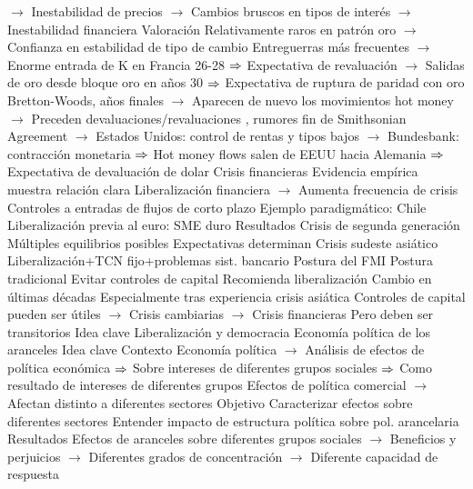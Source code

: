 \documentclass{nuevotema}
\begin{document}
\begin{esquemal}
				\4[] $\to$ Inestabilidad de precios
				\4[] $\to$ Cambios bruscos en tipos de interés
				\4[] $\to$ Inestabilidad financiera
				\4 Valoración
				\4[] Relativamente raros en patrón oro
				\4[] $\to$ Confianza en estabilidad de tipo de cambio
				\4[] Entreguerras más frecuentes
				\4[] $\to$ Enorme entrada de K en Francia 26-28
				\4[] $\Rightarrow$ Expectativa de revaluación
				\4[] $\to$ Salidas de oro desde bloque oro en años 30
				\4[] $\Rightarrow$ Expectativa de ruptura de paridad con oro
				\4[] Bretton-Woods, años finales
				\4[] $\to$ Aparecen de nuevo los movimientos hot money
				\4[] $\to$ Preceden devaluaciones/revaluaciones
				, rumores fin de Smithsonian Agreement
				\4[] $\to$ Estados Unidos: control de rentas y tipos bajos
				\4[] $\to$ Bundesbank: contracción monetaria
				\4[] $\Rightarrow$ Hot money flows salen de EEUU hacia Alemania
				\4[] $\Rightarrow$ Expectativa de devaluación de dolar
			\3 Crisis financieras
				\4 Evidencia empírica muestra relación clara
				\4[] Liberalización financiera
				\4[] $\to$ Aumenta frecuencia de crisis
			\3 Controles a entradas de flujos de corto plazo
				\4 Ejemplo paradigmático: Chile
			\3 Liberalización previa al euro: SME duro
				\4 Resultados
				\4[] Crisis de segunda generación
				\4[] Múltiples equilibrios posibles
				\4[] Expectativas determinan
			\3 Crisis sudeste asiático
				\4 Liberalización+TCN fijo+problemas sist. bancario
			\3 Postura del FMI
				\4 Postura tradicional
				\4[] Evitar controles de capital
				\4[] Recomienda liberalización
				\4 Cambio en últimas décadas
				\4[] Especialmente tras experiencia crisis asiática
				\4[] Controles de capital pueden ser útiles
				\4[] $\to$ Crisis cambiarias
				\4[] $\to$ Crisis financieras
				\4[] Pero deben ser transitorios
	\1 
		\2 Idea clave
		\2 Liberalización y democracia
		\2 Economía política de los aranceles
			\3 Idea clave
				\4 Contexto
				\4[] Economía política
				\4[] $\to$ Análisis de efectos de política económica
				\4[] $\Rightarrow$ Sobre intereses de diferentes grupos sociales
				\4[] $\Rightarrow$ Como resultado de intereses de diferentes grupos
				\4[] Efectos de política comercial
				\4[] $\to$ Afectan distinto a diferentes sectores
				\4 Objetivo
				\4[] Caracterizar efectos sobre diferentes sectores
				\4[] Entender impacto de estructura política sobre pol. arancelaria
				\4 Resultados
				\4[] Efectos de aranceles sobre diferentes grupos sociales
				\4[] $\to$ Beneficios y perjuicios
				\4[] $\to$ Diferentes grados de concentración
				\4[] $\to$ Diferente capacidad de respuesta

\end{esquemal}
\end{document}
